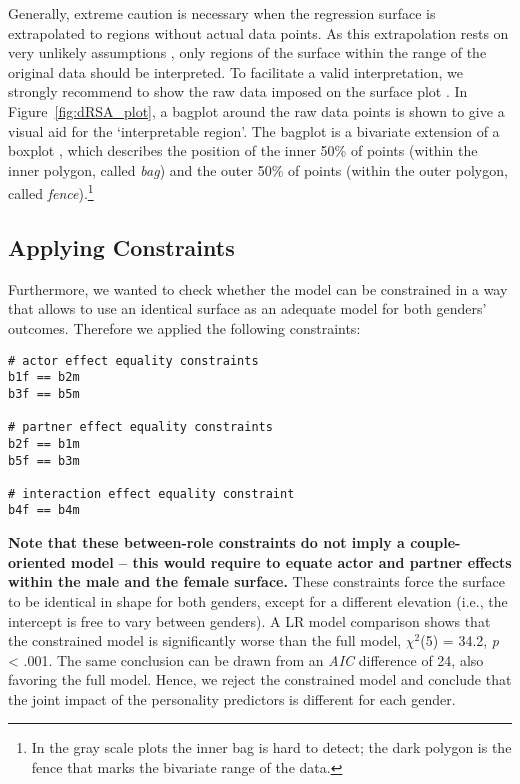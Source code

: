 \documentclass[jou,a4paper,draftfirst]{apa6}
\newcommand{\added}[1]{\textcolor{colour_added}{\bf{#1}}}
\begin{document}
Generally, extreme caution is necessary when the regression surface is extrapolated to regions without actual data points. As this extrapolation rests on very unlikely assumptions \parencite{montgomery_introduction_2012}, only regions of the surface within the range of the original data should be interpreted. To facilitate a valid interpretation, we strongly recommend to show the raw data imposed on the surface plot \parencite[see also][]{wilkinson_statistical_1999,tufte_visual_2001}. In Figure~\ref{fig:dRSA_plot}, a bagplot around the raw data points is shown to give a visual aid for the `interpretable region'. The bagplot is a bivariate extension of a boxplot \parencite{rousseeuw_bagplot:_1999}, which describes the position of the inner 50\% of points (within the inner polygon, called \emph{bag}) and the outer 50\% of points (within the outer polygon, called \emph{fence}).\footnote{In the gray scale plots the inner bag is hard to detect; the dark polygon is the fence that marks the bivariate range of the data.}

\subsection{Applying Constraints}
Furthermore, we wanted to check whether the model can be constrained in a way that allows to use an identical surface as an adequate model for both genders' outcomes. Therefore we applied the following constraints:

\begin{lstlisting}
# actor effect equality constraints
b1f == b2m
b3f == b5m

# partner effect equality constraints
b2f == b1m
b5f == b3m

# interaction effect equality constraint
b4f == b4m
\end{lstlisting}

\added{Note that these between-role constraints do not imply a couple-oriented model -- this would require to equate actor and partner effects within the male and the female surface.} These constraints force the surface to be identical in shape for both genders, except for a different elevation (i.e., the intercept is free to vary between genders). A LR model comparison shows that the constrained model is significantly worse than the full model, $\chi^2$(5) = 34.2, \textit{p} < .001. The same conclusion can be drawn from an \emph{AIC} difference of 24, also favoring the full model. Hence, we reject the constrained model and conclude that the joint impact of the personality predictors is different for each gender. 
\end{document}
